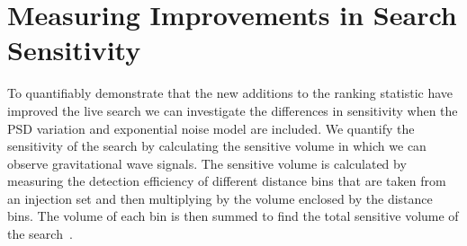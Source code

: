   
  


\section{\label{5:sec:injection-tests}Measuring Improvements in Search Sensitivity}

To quantifiably demonstrate that the new additions to the ranking statistic have improved the live search we can investigate the differences in sensitivity when the PSD variation and exponential noise model are included. We quantify the sensitivity of the search by calculating the sensitive volume in which we can observe gravitational wave signals. The sensitive volume is calculated by measuring the detection efficiency of different distance bins that are taken from an injection set and then multiplying by the volume enclosed by the distance bins. The volume of each bin is then summed to find the total sensitive volume of the search~\cite{rw_snr_eq:2012}.

